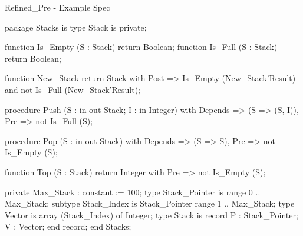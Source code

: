 \documentclass{beamer}
\begin{document}
\begin{frame}[fragile]{Refined\_Pre - Example Spec}

  \begin{pxcode}[language=SPARK,style=tinystyle,gobble=4]
    package Stacks
    is
       type Stack is private;
    
       function Is_Empty (S : Stack) return Boolean;
       function Is_Full (S : Stack) return Boolean;
    
       function New_Stack return Stack
       with Post => Is_Empty (New_Stack'Result) and
         not Is_Full (New_Stack'Result);
    
       procedure Push (S : in out Stack; I : in Integer)
       with Depends => (S => (S, I)),
            Pre     => not Is_Full (S);
    
       procedure Pop (S : in out Stack)
       with Depends => (S => S),
            Pre     => not Is_Empty (S);
    
       function Top (S : Stack) return Integer
       with Pre => not Is_Empty (S);
    
    private
       Max_Stack : constant := 100;
       type Stack_Pointer is range 0 .. Max_Stack;
       subtype Stack_Index is Stack_Pointer range 1 .. Max_Stack;
       type Vector is array (Stack_Index) of Integer;
       type Stack is record
          P : Stack_Pointer;
          V : Vector;
       end record;
    end Stacks;
       
 \end{pxcode}

\end{frame}
\end{document}
